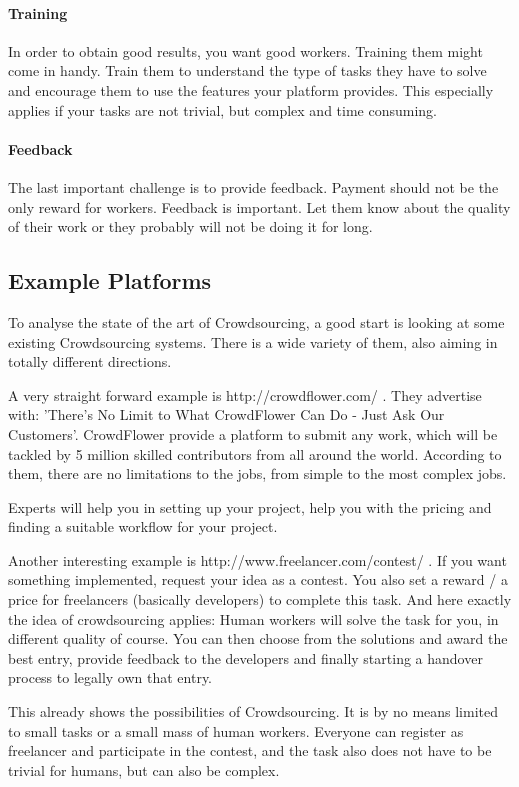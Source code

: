 \documentclass{sig-alternate}
\begin{document}
\paragraph{Training}
In order to obtain good results, you want good workers. Training them might come in handy. Train them to understand the type of 
tasks they have to solve and encourage them to use the features your platform provides. This especially applies if your tasks are not
trivial, but complex and time consuming.

\paragraph{Feedback}
The last important challenge is to provide feedback. Payment should not be the only reward for workers. Feedback is important.
Let them know about the quality of their work or they probably will not be doing it for long.


\subsection{Example Platforms}

To analyse the state of the art of Crowdsourcing, a good start is looking at some existing Crowdsourcing systems.
There is a wide variety of them, also aiming in totally different directions.

A very straight forward example is http://crowdflower.com/ .
They advertise with: 'There's No Limit to What CrowdFlower Can Do - Just Ask Our Customers'.
CrowdFlower provide a platform to submit any work, which will be tackled by 5 million skilled contributors from all around the world.
According to them, there are no limitations to the jobs, from simple to the most complex jobs.

Experts will help you in setting up your project, help you with the pricing and finding a suitable workflow for your project.

Another interesting example is http://www.freelancer.com/contest/ .
If you want something implemented, request your idea as a contest. You also set a reward / a price for freelancers (basically developers) to complete this task.
And here exactly the idea of crowdsourcing applies: Human workers will solve the task for you, in different quality of course. You can then choose
from the solutions and award the best entry, provide feedback to the developers and finally starting a handover process to legally own that entry.

This already shows the possibilities of Crowdsourcing. It is by no means limited to small tasks or a small mass of human workers.
Everyone can register as freelancer and participate in the contest, and the task also does not have to be trivial for humans, but can also be complex.
\end{document}
